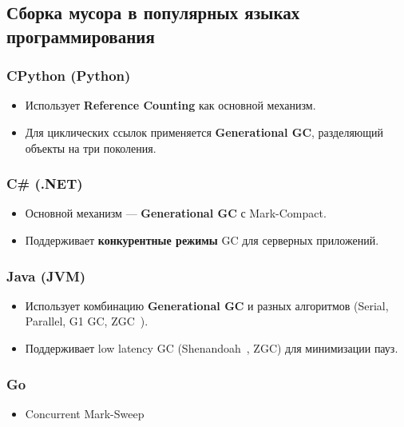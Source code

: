 \subsection{Сборка мусора в популярных языках программирования}

\subsubsection{CPython (Python)}
\begin{itemize}
    \item Использует \textbf{Reference Counting} как основной механизм.
    \item Для циклических ссылок применяется \textbf{Generational GC}, разделяющий объекты на три поколения.~\cite{pythonoverview}
\end{itemize}

\subsubsection{C\# (.NET)}
\begin{itemize}
    \item Основной механизм — \textbf{Generational GC} с Mark-Compact.
    \item Поддерживает \textbf{конкурентные режимы} GC для серверных приложений.~\cite{clrgc}
\end{itemize}

\subsubsection{Java (JVM)}
\begin{itemize}
    \item Использует комбинацию \textbf{Generational GC} и разных алгоритмов (Serial, Parallel, G1 GC, ZGC~\cite{oraclegc}).
    \item Поддерживает low latency GC (Shenandoah~\cite{shenandoahoverview}, ZGC) для минимизации пауз.
\end{itemize}

\subsubsection{Go}
\begin{itemize}
    \item Concurrent Mark-Sweep~\cite{gogcguide}
\end{itemize}


